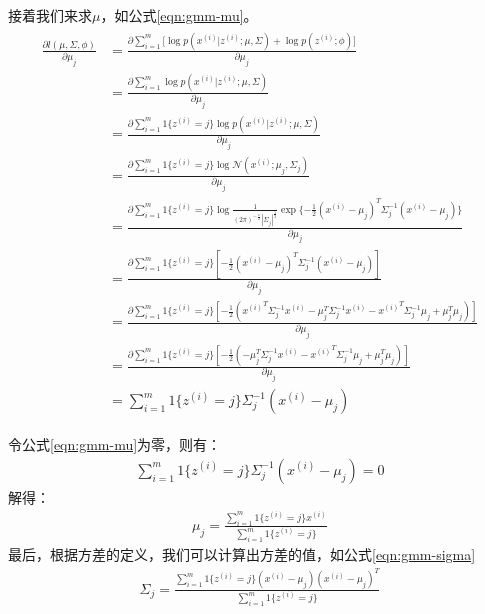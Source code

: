 接着我们来求$\mu$，如公式\ref{eqn:gmm-mu}。
\begin{align}
\label{eqn:gmm-mu}
\begin{split}
  \frac{\partial l(\mu,\Sigma,\phi)}{\partial \mu_j}
  &=\frac{\partial \sum_{i=1}^{m} \Big[\log p(x^{(i)}|z^{(i)};\mu,\Sigma) + \log p(z^{(i)};\phi) \Big]}{\partial \mu_j} \\
  &= \frac{\partial \sum_{i=1}^{m}\log p(x^{(i)}|z^{(i)};\mu,\Sigma)}{\partial \mu_j} \\
  &= \frac{\partial \sum_{i=1}^{m} 1\{z^{(i)}=j\} \log p(x^{(i)}|z^{(i)};\mu,\Sigma)}{\partial \mu_j} \\
  &= \frac{\partial \sum_{i=1}^{m} 1\{z^{(i)}=j\} \log{\mathcal{N}(x^{(i)}; \mu_j, \Sigma_j)} }{\partial \mu_j} \\
  &= \frac{\partial \sum_{i=1}^{m} 1\{z^{(i)}=j\} \log \frac{1}{(2\pi)^{-\frac{n}{2}}|\Sigma_j|^{\frac{1}{2}}} \exp{\{-\frac{1}{2}(x^{(i)}-\mu_j)^{T}\Sigma_j^{-1}(x^{(i)}-\mu_j)\}} }{\partial \mu_j} \\
  &= \frac{\partial \sum_{i=1}^{m} 1\{z^{(i)}=j\} [-\frac{1}{2}(x^{(i)}-\mu_j)^{T}\Sigma_j^{-1}(x^{(i)}-\mu_j)]}{\partial \mu_j} \\
  &= \frac{\partial \sum_{i=1}^{m} 1\{z^{(i)}=j\} [-\frac{1}{2}({x^{(i)}}^{T}\Sigma_j^{-1}{x^{(i)}} - \mu_j^{T}\Sigma_j^{-1}x^{(i)} - {x^{(i)}}^{T}\Sigma_j^{-1}\mu_j + \mu_j^{T}\mu_j)]}{\partial \mu_j} \\
  &= \frac{\partial \sum_{i=1}^{m} 1\{z^{(i)}=j\} [-\frac{1}{2}(-\mu_j^{T}\Sigma_j^{-1}{x^{(i)}} - {x^{(i)}}^{T}\Sigma_j^{-1}\mu_j + \mu_j^{T}\mu_j)]}{\partial \mu_j} \\
  &= \sum_{i=1}^{m} 1\{z^{(i)}=j\}\Sigma_j^{-1} ( {x^{(i)}} - \mu_j) 
\end{split}
\end{align}

令公式\ref{eqn:gmm-mu}为零，则有：
\begin{align}
\label{eqn:gmm-mu1}
\sum_{i=1}^{m} 1\{z^{(i)}=j\}\Sigma_j^{-1} ({x^{(i)}} - \mu_j) = 0
\end{align}
解得：
\begin{align}
\label{eqn:gmm-mu2}
\mu_j = \frac{\sum_{i=1}^{m} 1\{z^{(i)}=j\} x^{(i)}}{\sum_{i=1}^{m} 1\{z^{(i)}=j\}}
\end{align}
最后，根据方差的定义，我们可以计算出方差的值，如公式\ref{eqn:gmm-sigma}
\begin{align}
\label{eqn:gmm-sigma}
\Sigma_j = \frac{\sum_{i=1}^{m} 1\{z^{(i)}=j\} (x^{(i)}-\mu_j)(x^{(i)}-\mu_j)^{T}}{\sum_{i=1}^{m} 1\{z^{(i)}=j\}}
\end{align}
